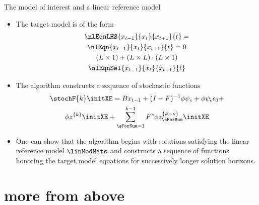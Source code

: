 \documentclass[12pt]{article}
\begin{document}


{The model of interest and a linear reference model}
\begin{itemize}
\item The target model is of the form
\begin{gather}
\nlEqnLHS{x_{t-1}}{x_t}{x_{t+1}}{t}=\\
\nlEqn{x_{t-1}}{x_t}{x_{t+1}}{t}=0\\ \label{refMod}
 (L \times 1) +  (L \times L ) \cdot (L \times 1)\\
\nlEqnSel{x_{t-1}}{x_t}{x_{t+1}}{t}\\ 
\end{gather}



\item The algorithm constructs a sequence of stochastic 
functions 
  \begin{gather}
	 \stochF{k}\initXE =B x_{t-1}+ (I - F)^{-1} \phi \psi_c+  \phi \psi_\epsilon\epsilon_0  +\\ \phi z^{\{k\}}\initXE+ \sum_{\sForSum=1}^{k-1} F^s \phi z^{\{k-\nu\}}_{\sForSum}\initXE 
\label{theSeries}
  \end{gather}

\item One can show that the algorithm begins with solutions satisfying 
the linear reference model $\linModMats$ and
constructs a sequence of functions
 honoring the target model equations for successively 
longer solution horizons.
  \end{itemize}

\section{more from above}
\label{sec:more-from-above}
\end{document}
